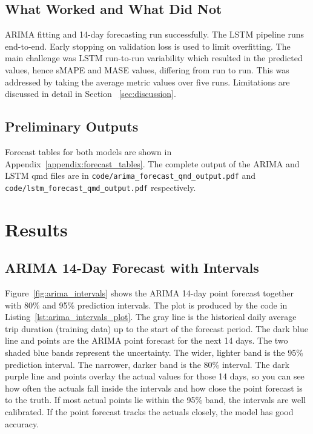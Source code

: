 \documentclass[12pt, a4paper]{article}
\begin{document}
\subsection{What Worked and What Did Not}

ARIMA fitting and 14-day forecasting run successfully. The LSTM pipeline runs end-to-end. Early stopping on validation loss is used to limit overfitting. The main challenge was LSTM run-to-run variability which resulted in the predicted values, hence sMAPE and MASE values, differing from run to run. This was addressed by taking the average metric values over five runs. Limitations are discussed in detail in Section ~\ref{sec:discussion}.


\subsection{Preliminary Outputs}

Forecast tables for both models are shown in Appendix~\ref{appendix:forecast_tables}. The complete output of the ARIMA and LSTM qmd files are in \texttt{code/arima\_forecast\_qmd\_output.pdf} and \texttt{code/lstm\_forecast\_qmd\_output.pdf} respectively. 

\section{Results}

\subsection{ARIMA 14-Day Forecast with Intervals}

Figure~\ref{fig:arima_intervals} shows the ARIMA 14-day point forecast together with 80\% and 95\% prediction intervals. The plot is produced by the code in Listing~\ref{lst:arima_intervals_plot}. The gray line is the historical daily average trip duration (training data) up to the start of the forecast period. The dark blue line and points are the ARIMA point forecast for the next 14 days. The two shaded blue bands represent the uncertainty. The wider, lighter band is the 95\% prediction interval. The narrower, darker band is the 80\% interval. The dark purple line and points overlay the actual values for those 14 days, so you can see how often the actuals fall inside the intervals and how close the point forecast is to the truth. If most actual points lie within the 95\% band, the intervals are well calibrated. If the point forecast tracks the actuals closely, the model has good accuracy.
\end{document}
